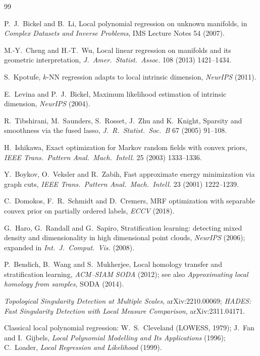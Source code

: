 \documentclass[11pt]{article}
\theoremstyle{definition}
\theoremstyle{remark}
\begin{document}
\begin{thebibliography}{99}\small

 P.~J.~Bickel and B.~Li,
  Local polynomial regression on unknown manifolds,
  in \emph{Complex Datasets and Inverse Problems}, IMS Lecture Notes 54 (2007).

 M.-Y.~Cheng and H.-T.~Wu,
  Local linear regression on manifolds and its geometric interpretation,
  \emph{J.\ Amer.\ Statist.\ Assoc.} 108 (2013) 1421--1434.

 S.~Kpotufe,
  $k$-NN regression adapts to local intrinsic dimension,
  \emph{NeurIPS} (2011).

 E.~Levina and P.~J.~Bickel,
  Maximum likelihood estimation of intrinsic dimension,
  \emph{NeurIPS} (2004).

 R.~Tibshirani, M.~Saunders, S.~Rosset, J.~Zhu and K.~Knight,
  Sparsity and smoothness via the fused lasso,
  \emph{J.\ R.\ Statist.\ Soc.\ B} 67 (2005) 91--108.

 H.~Ishikawa,
  Exact optimization for Markov random fields with convex priors,
  \emph{IEEE Trans.\ Pattern Anal.\ Mach.\ Intell.} 25 (2003) 1333--1336.

 Y.~Boykov, O.~Veksler and R.~Zabih,
  Fast approximate energy minimization via graph cuts,
  \emph{IEEE Trans.\ Pattern Anal.\ Mach.\ Intell.} 23 (2001) 1222--1239.

 C.~Domokos, F.~R.~Schmidt and D.~Cremers,
  MRF optimization with separable convex prior on partially ordered labels,
  \emph{ECCV} (2018).

 G.~Haro, G.~Randall and G.~Sapiro,
  Stratification learning: detecting mixed density and dimensionality in high
  dimensional point clouds, \emph{NeurIPS} (2006); expanded in
  \emph{Int.\ J.\ Comput.\ Vis.} (2008).

 P.~Bendich, B.~Wang and S.~Mukherjee,
  Local homology transfer and stratification learning, \emph{ACM--SIAM SODA}
  (2012); see also \emph{Approximating local homology from samples}, SODA (2014).

 \emph{Topological Singularity Detection at Multiple Scales},
  arXiv:2210.00069; \emph{HADES: Fast Singularity Detection with Local Measure
  Comparison}, arXiv:2311.04171.

 Classical local polynomial regression:
  W.~S.~Cleveland (LOWESS, 1979); J.~Fan and I.~Gijbels,
  \emph{Local Polynomial Modelling and Its Applications} (1996);
  C.~Loader, \emph{Local Regression and Likelihood} (1999).

\end{thebibliography}
\end{document}
